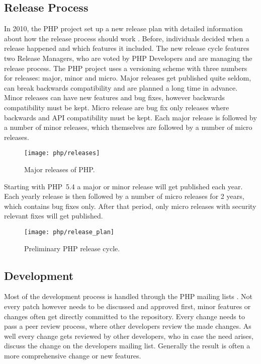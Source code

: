 
\subsection{Release Process} %

In 2010, the PHP project set up a new release plan with detailed information
about how the release process should work \cite{PHPRelease}. Before,
individuals decided when a release happened and which features it included. The
new release cycle features two Release Managers, who are voted by PHP
Developers and are managing the release process. The PHP project uses a
versioning scheme with three numbers for releases: major, minor and micro.
Major releases get published quite seldom, can break backwards compatibility
and are planned a long time in advance. Minor releases can have new features
and bug fixes, however backwards compatibility must be kept. Micro release are
bug fix only releases where backwards and \ac{API} compatibility must be kept.
Each major release is followed by a number of minor releases, which themselves
are followed by a number of micro releases.

\begin{figure}[htbp]
  \centering
  \texttt{[image: php/releases]}
  \caption[Major Releases of PHP]{Major releases of PHP.}
\end{figure}

Starting with PHP~5.4 a major or minor release will get published each year.
Each yearly release is then followed by a number of micro releases for 2 years,
which contains bug fixes only. After that period, only micro releases with
security relevant fixes will get published.

\begin{figure}[htbp]
  \centering
  \texttt{[image: php/release\_plan]}
  \caption[Preliminary PHP Release Cycle]{Preliminary PHP release cycle.}
\end{figure}


\subsection{Development} %

Most of the development process is handled through the PHP mailing lists
\cite{PHPRelease,Magnusson2010,PHPVoting}. Not every patch however needs to be
discussed and approved first, minor features or changes often get directly
committed to the repository. Every change needs to pass a peer review process,
where other developers review the made changes. As well every change gets
reviewed by other developers, who in case the need arises, discuss the change
on the developers mailing list. Generally the result is often a more
comprehensive change or new features.

